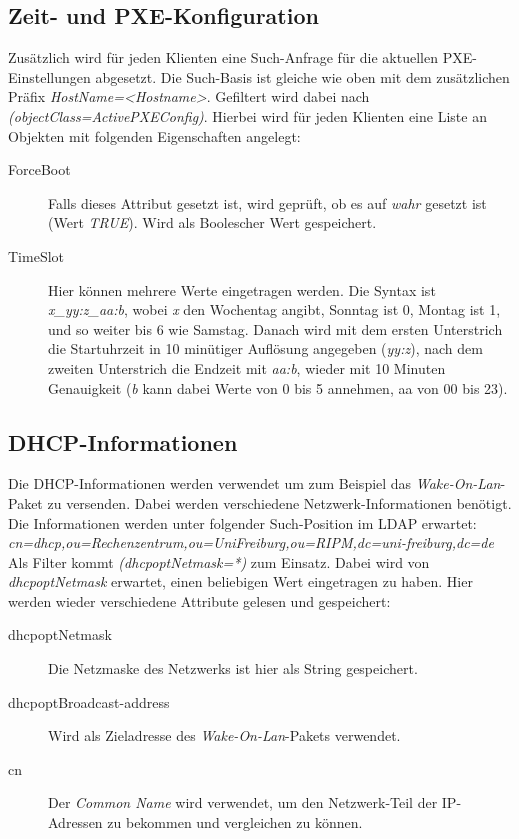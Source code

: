\documentclass[	
				a4paper, 
				twoside,
				11pt,
				DIV11,
				BCOR12mm,
				bibtotoc, 
				halfparskip, 
				headsepline, 
				pointlessnumbers]{scrartcl}
\begin{document}
\subsection{Zeit- und PXE-Konfiguration}
Zusätzlich wird für jeden Klienten eine Such-Anfrage für die aktuellen PXE-Einstellungen abgesetzt.
Die Such-Basis ist gleiche wie oben mit dem zusätzlichen Präfix \textit{HostName=<Hostname>}.
Gefiltert wird dabei nach \textit{(objectClass=ActivePXEConfig)}. Hierbei wird für jeden Klienten eine Liste an Objekten mit folgenden Eigenschaften angelegt:
\begin{description}
\item[ForceBoot] Falls dieses Attribut gesetzt ist, wird geprüft, ob es auf \textit{wahr} gesetzt ist (Wert \textit{TRUE}). Wird als Boolescher Wert gespeichert.
\item[TimeSlot] Hier können mehrere Werte eingetragen werden. Die Syntax ist \textit{x\_yy:z\_aa:b}, wobei \textit{x} den Wochentag angibt, Sonntag ist 0, Montag ist 1, und so weiter bis 6 wie Samstag. Danach wird mit dem ersten Unterstrich die Startuhrzeit in 10 minütiger Auflösung angegeben (\textit{yy:z}), nach dem zweiten Unterstrich die Endzeit mit \textit{aa:b}, wieder mit 10 Minuten Genauigkeit (\textit{b} kann dabei Werte von 0 bis 5 annehmen, aa von 00 bis 23).
\end{description}


\subsection{DHCP-Informationen}
Die DHCP-Informationen werden verwendet um zum Beispiel das \textit{Wake-On-Lan}-Paket zu versenden. Dabei werden verschiedene Netzwerk-Informationen benötigt. Die Informationen werden unter folgender Such-Position im LDAP erwartet: \\
\textit{cn=dhcp,ou=Rechenzentrum,ou=UniFreiburg,ou=RIPM,dc=uni-freiburg,dc=de} \\
Als Filter kommt \textit{(dhcpoptNetmask=*)} zum Einsatz. Dabei wird von \textit{dhcpoptNetmask} erwartet, einen beliebigen Wert eingetragen zu haben.
Hier werden wieder verschiedene Attribute gelesen und gespeichert:
\begin{description}
\item[dhcpoptNetmask] Die Netzmaske des Netzwerks ist hier als String gespeichert.
\item[dhcpoptBroadcast-address] Wird als Zieladresse des \textit{Wake-On-Lan}-Pakets verwendet.
\item[cn] Der \textit{Common Name} wird verwendet, um den Netzwerk-Teil der IP-Adressen zu bekommen und vergleichen zu können.
\end{description}
\end{document}

